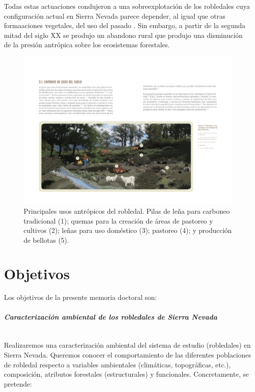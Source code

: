 Todas estas actuaciones condujeron a una sobreexplotación de los robledales cuya configuración actual en Sierra Nevada parece depender, al igual que otras formaaciones vegetales, del uso del pasado \autocite{NavarroGonzalezetal2013WeightLanduse}. Sin embargo, a partir de la segunda mitad del siglo XX se produjo un abandono rural que produjo una disminución de la presión antrópica sobre los ecosistemas forestales. 

\begin{figure}
	\centering
	\includegraphics[width=\textwidth]{img/intro/intro-usos.pdf} \caption{Principales usos antrópicos del robledal. Pilas de leña para carboneo tradicional (1); quemas para la creación de áreas de pastoreo y cultivos (2); leñas para uso doméstico (3); pastoreo (4); y producción de bellotas (5).}\label{fig:intro:usos}
\end{figure}

\section{Objetivos}

Los objetivos de la presente memoria doctoral son: 

\paragraph{\emph{Caracterización ambiental de los robledales de Sierra Nevada}} \mbox{} \\
Realizaremos una caracterización ambiental del sistema de estudio (robledales) en Sierra Nevada. Queremos conocer el comportamiento de las diferentes poblaciones de robledal respecto a variables ambientales (climáticas, topográficas, etc.), composición, atributos forestales (estructurales) y funcionales. Concretamente, se pretende:

